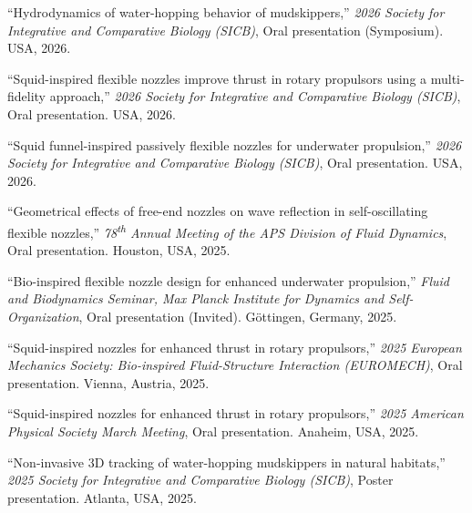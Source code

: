 \begin{pubSubsectionNum}

  \item ``Hydrodynamics of water-hopping behavior of mudskippers,''
        \textit{2026 Society for Integrative and Comparative Biology (SICB)},
        Oral presentation (Symposium).
        \textcolor{BrickRed}{USA}, 2026.

  \item ``Squid-inspired flexible nozzles improve thrust in rotary propulsors
        using a multi-fidelity approach,''
        \textit{2026 Society for Integrative and Comparative Biology (SICB)},
        Oral presentation.
        \textcolor{BrickRed}{USA}, 2026.

  \item ``Squid funnel-inspired passively flexible nozzles for underwater propulsion,''
        \textit{2026 Society for Integrative and Comparative Biology (SICB)},
        Oral presentation.
        \textcolor{BrickRed}{USA}, 2026.

  \item ``Geometrical effects of free-end nozzles on wave reflection
        in self-oscillating flexible nozzles,''
        \textit{78\textsuperscript{th} Annual Meeting of the APS Division of Fluid Dynamics},
        Oral presentation.
        \textcolor{BrickRed}{Houston, USA}, 2025.

  \item ``Bio-inspired flexible nozzle design for enhanced underwater propulsion,''
        \textit{Fluid and Biodynamics Seminar, Max Planck Institute for Dynamics and Self-Organization},
        Oral presentation (Invited).
        \textcolor{BrickRed}{G\"{o}ttingen, Germany}, 2025.

  \item ``Squid-inspired nozzles for enhanced thrust in rotary propulsors,''
        \textit{2025 European Mechanics Society: Bio-inspired Fluid-Structure Interaction (EUROMECH)},
        Oral presentation.
        \textcolor{BrickRed}{Vienna, Austria}, 2025.

  \item ``Squid-inspired nozzles for enhanced thrust in rotary propulsors,''
        \textit{2025 American Physical Society March Meeting},
        Oral presentation.
        \textcolor{BrickRed}{Anaheim, USA}, 2025.

  \item ``Non-invasive 3D tracking of water-hopping mudskippers in natural habitats,''
        \textit{2025 Society for Integrative and Comparative Biology (SICB)},
        Poster presentation.
        \textcolor{BrickRed}{Atlanta, USA}, 2025.


\end{pubSubsectionNum}
